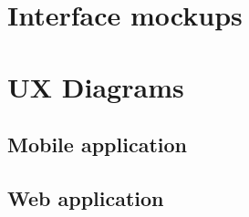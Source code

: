      \section{Interface mockups}
     \section{UX Diagrams}
          \subsection{Mobile application}          
          \subsection{Web application}
